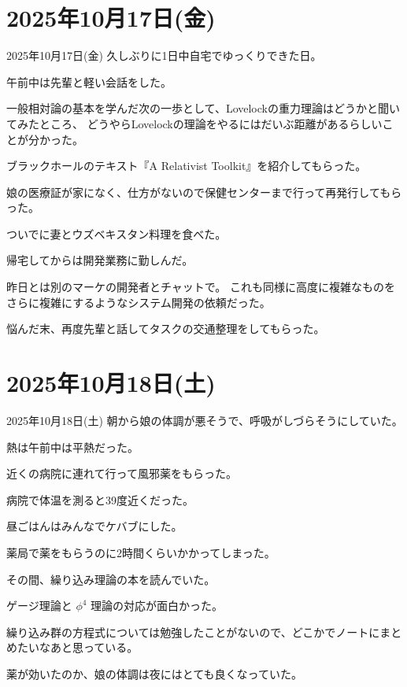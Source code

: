 \documentclass[dvipdfmx, autodetect-engine, aspectratio=169, 10.5pt]{beamer}
\begin{document}
\section{2025年10月17日(金)}

\begin{frame}{2025年10月17日(金)}
	久しぶりに1日中自宅でゆっくりできた日。

	午前中は先輩と軽い会話をした。

	一般相対論の基本を学んだ次の一歩として、Lovelockの重力理論はどうかと聞いてみたところ、
	どうやらLovelockの理論をやるにはだいぶ距離があるらしいことが分かった。

	ブラックホールのテキスト『A Relativist Toolkit』を紹介してもらった。

	娘の医療証が家になく、仕方がないので保健センターまで行って再発行してもらった。

	ついでに妻とウズベキスタン料理を食べた。

	帰宅してからは開発業務に勤しんだ。

	昨日とは別のマーケの開発者とチャットで。
	これも同様に高度に複雑なものをさらに複雑にするようなシステム開発の依頼だった。

	悩んだ末、再度先輩と話してタスクの交通整理をしてもらった。
\end{frame}

\section{2025年10月18日(土)}

\begin{frame}{2025年10月18日(土)}
	朝から娘の体調が悪そうで、呼吸がしづらそうにしていた。

	熱は午前中は平熱だった。

	近くの病院に連れて行って風邪薬をもらった。

	病院で体温を測ると39度近くだった。

	昼ごはんはみんなでケバブにした。

	薬局で薬をもらうのに2時間くらいかかってしまった。

	その間、繰り込み理論の本を読んでいた。

	ゲージ理論と $\phi^{4}$ 理論の対応が面白かった。

	繰り込み群の方程式については勉強したことがないので、どこかでノートにまとめたいなあと思っている。

	薬が効いたのか、娘の体調は夜にはとても良くなっていた。
\end{frame}
\end{document}
